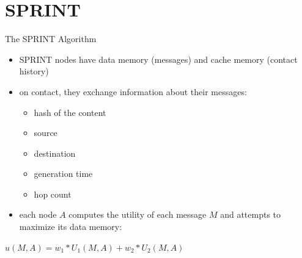 \documentclass{beamer}
\begin{document}
\section{SPRINT}
\begin{frame}{The SPRINT Algorithm}
	\begin{itemize}
		\item SPRINT nodes have data memory (messages) and cache memory (contact history)
		\item on contact, they exchange information about their messages:
		\begin{itemize}
			\item hash of the content
			\item source
			\item destination
			\item generation time
			\item hop count
		\end{itemize}
		\item each node $A$ computes the utility of each message $M$ and attempts to maximize its data memory:
	\end{itemize}
	
	\hskip0.5in
	\small{
		\begin{beamerboxesrounded}[lower=block body,shadow=true,width=3.2in]{}
			\begin{center}
				\texttt{$u(M, A) = w_1 * U_1(M, A) + w_2 * U_2(M, A)$}
			\end{center}
		\end{beamerboxesrounded}
	}
\end{frame}
\end{document}
